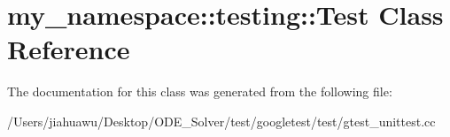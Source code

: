 \hypertarget{classmy__namespace_1_1testing_1_1_test}{}\section{my\+\_\+namespace\+:\+:testing\+:\+:Test Class Reference}
\label{classmy__namespace_1_1testing_1_1_test}


The documentation for this class was generated from the following file\+:\begin{DoxyCompactItemize}
\item 
/\+Users/jiahuawu/\+Desktop/\+O\+D\+E\+\_\+\+Solver/test/googletest/test/gtest\+\_\+unittest.\+cc\end{DoxyCompactItemize}
